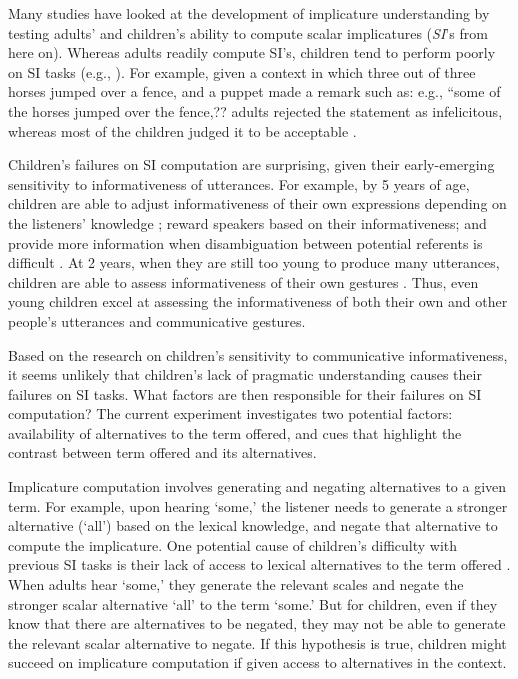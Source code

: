 \documentclass[10pt,letterpaper]{article}
\begin{document}
Many studies have looked at the development of implicature understanding by testing adults' and children's ability to compute scalar implicatures (\emph{SI}'s from here on). Whereas adults readily compute SI's, children tend to perform poorly on SI tasks (e.g., ). For example, given a context in which three out of three horses jumped over a fence, and a puppet made a remark such as: e.g., ``some of the horses jumped over the fence,?? adults rejected the statement as infelicitous, whereas most of the children judged it to be acceptable \cite{papafragou2003scalar}. %

Children's failures on SI computation are surprising, given their early-emerging sensitivity to informativeness of utterances. For example, by 5 years of age, children are able to adjust informativeness of their own expressions depending on the listeners' knowledge \cite{matthews2006effect}; reward speakers based on their informativeness\cite{katsos2011pragmatic}; and provide more information when disambiguation between potential referents is difficult \cite{matthews2012two}. At 2 years, when they are still too young to produce many utterances, children are able to assess informativeness of their own gestures \cite{o2001two}. Thus, even young children excel at assessing the informativeness of both their own and other people's utterances and communicative gestures. 

Based on the research on children's sensitivity to communicative informativeness, it seems unlikely that children's lack of pragmatic understanding causes their failures on SI tasks. What factors are then responsible for their failures on SI computation? The current experiment investigates two potential factors: availability of alternatives to the term offered, and cues that highlight the contrast between term offered and its alternatives. 

Implicature computation involves generating and negating alternatives to a given term. For example, upon hearing `some,' the listener needs to generate a stronger alternative (`all') based on the lexical knowledge, and negate that alternative to compute the implicature. One potential cause of children's difficulty with previous SI tasks is their lack of access to lexical alternatives to the term offered \cite{barner2011accessing}. When adults hear `some,' they generate the relevant scales and negate the stronger scalar alternative `all' to the term `some.' But for children, even if they know that there are alternatives to be negated, they may not be able to generate the relevant scalar alternative to negate. If this hypothesis is true, children might succeed on implicature computation if given access to alternatives in the context.
\end{document}
